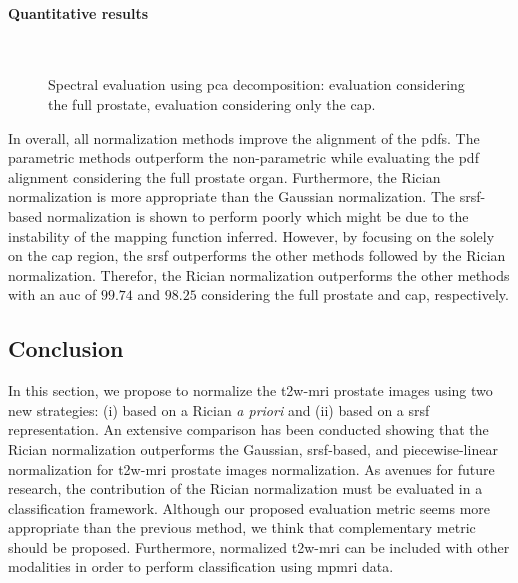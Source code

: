 \paragraph{Quantitative results}

\begin{figure}
  \centering
  \\
  \caption{Spectral evaluation using \ac{pca} decomposition: \protect{} evaluation considering the full prostate, \protect{} evaluation considering only the \ac{cap}.}
  \label{fig:qt}
\end{figure}

In overall, all normalization methods improve the alignment of the \acp{pdf}.
The parametric methods outperform the non-parametric while evaluating the \ac{pdf} alignment considering the full prostate organ.
Furthermore, the Rician normalization is more appropriate than the Gaussian normalization.
The \ac{srsf}-based normalization is shown to perform poorly which might be due to the instability of the mapping function inferred.
However, by focusing on the solely on the \ac{cap} region, the \ac{srsf} outperforms the other methods followed by the Rician normalization.
Therefor, the Rician normalization outperforms the other methods with an \ac{auc} of $99.74$ and $98.25$ considering the full prostate and \ac{cap}, respectively.

\subsection{Conclusion}\label{subsec:chp5:T2-norm:dis-con}
In this section, we propose to normalize the \ac{t2w}-\ac{mri} prostate images using two new strategies: (i) based on a Rician \textit{a priori} and (ii) based on a \ac{srsf} representation.
An extensive comparison has been conducted showing that the Rician normalization outperforms the Gaussian, \ac{srsf}-based, and piecewise-linear normalization for \ac{t2w}-\ac{mri} prostate images normalization.
As avenues for future research, the contribution of the Rician normalization must be evaluated in a classification framework.
Although our proposed evaluation metric seems more appropriate than the previous method, we think that complementary metric should be proposed.
Furthermore, normalized \ac{t2w}-\ac{mri} can be included with other modalities in order to perform classification using \ac{mpmri} data.
